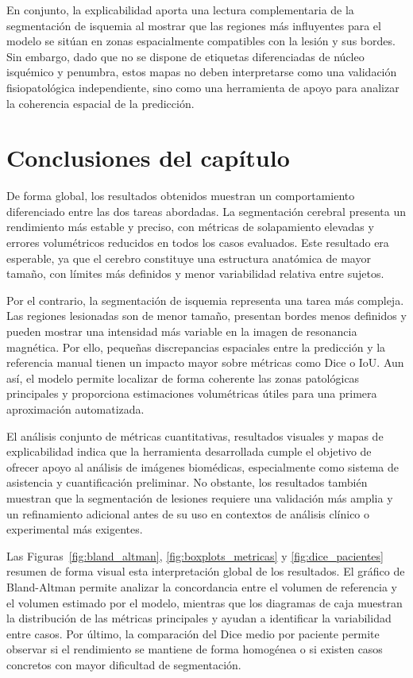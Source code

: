 En conjunto, la explicabilidad aporta una lectura complementaria de la segmentación de isquemia al mostrar que las regiones más influyentes para el modelo se sitúan en zonas espacialmente compatibles con la lesión y sus bordes. Sin embargo, dado que no se dispone de etiquetas diferenciadas de núcleo isquémico y penumbra, estos mapas no deben interpretarse como una validación fisiopatológica independiente, sino como una herramienta de apoyo para analizar la coherencia espacial de la predicción.



\section{Conclusiones del capítulo}

De forma global, los resultados obtenidos muestran un comportamiento diferenciado entre las dos tareas abordadas. La segmentación cerebral presenta un rendimiento más estable y preciso, con métricas de solapamiento elevadas y errores volumétricos reducidos en todos los casos evaluados. Este resultado era esperable, ya que el cerebro constituye una estructura anatómica de mayor tamaño, con límites más definidos y menor variabilidad relativa entre sujetos.

Por el contrario, la segmentación de isquemia representa una tarea más compleja. Las regiones lesionadas son de menor tamaño, presentan bordes menos definidos y pueden mostrar una intensidad más variable en la imagen de resonancia magnética. Por ello, pequeñas discrepancias espaciales entre la predicción y la referencia manual tienen un impacto mayor sobre métricas como Dice o IoU. Aun así, el modelo permite localizar de forma coherente las zonas patológicas principales y proporciona estimaciones volumétricas útiles para una primera aproximación automatizada.

El análisis conjunto de métricas cuantitativas, resultados visuales y mapas de explicabilidad indica que la herramienta desarrollada cumple el objetivo de ofrecer apoyo al análisis de imágenes biomédicas, especialmente como sistema de asistencia y cuantificación preliminar. No obstante, los resultados también muestran que la segmentación de lesiones requiere una validación más amplia y un refinamiento adicional antes de su uso en contextos de análisis clínico o experimental más exigentes.

Las Figuras~\ref{fig:bland_altman}, \ref{fig:boxplots_metricas} y \ref{fig:dice_pacientes} resumen de forma visual esta interpretación global de los resultados. El gráfico de Bland-Altman permite analizar la concordancia entre el volumen de referencia y el volumen estimado por el modelo, mientras que los diagramas de caja muestran la distribución de las métricas principales y ayudan a identificar la variabilidad entre casos. Por último, la comparación del Dice medio por paciente permite observar si el rendimiento se mantiene de forma homogénea o si existen casos concretos con mayor dificultad de segmentación.

